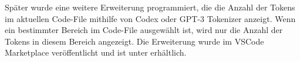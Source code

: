 Später wurde eine weitere Erweiterung programmiert, die die Anzahl der Tokens im aktuellen Code-File mithilfe von Codex oder GPT-3 Tokenizer anzeigt. Wenn ein bestimmter Bereich im Code-File ausgewählt ist, wird nur die Anzahl der Tokens in diesem Bereich angezeigt. Die Erweiterung wurde im VSCode Marketplace veröffentlicht und ist unter \cite{tokenizer} erhältlich.


